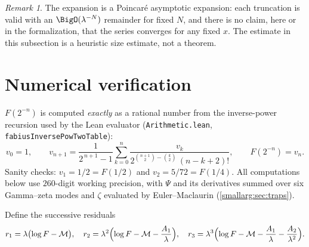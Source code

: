\documentclass[11pt,oneside]{article}
\theoremstyle{definition}
\theoremstyle{remark}
\newtheorem{remark}[remark]{Remark}
\begin{document}
\begin{remark}
The expansion is a Poincar\'e asymptotic expansion: each truncation is valid
with an $\BigO(\lambda^{-N})$ remainder for fixed $N$, and there is no claim,
here or in the formalization, that the series converges for any fixed $x$.
The estimate in this subsection is a heuristic size estimate, not a theorem.
\end{remark}

\section{Numerical verification}\label{smallarg:sec:numerics}

$F(2^{-n})$ is computed \emph{exactly} as a rational number from the
inverse-power recursion used by the Lean evaluator
(\nolinkurl{Arithmetic.lean}, \lstinline[style=pseudo]{fabiusInversePowTwoTable}):
\[
  v_0=1,\qquad
  v_{n+1}=\frac{1}{2^{\,n+1}-1}
    \sum_{k=0}^{n}\frac{v_k}{2^{\binom{n+1}{2}-\binom{k}{2}}\,(n-k+2)!},
  \qquad F(2^{-n})=v_n.
\]
Sanity checks: $v_1=1/2=F(1/2)$ and $v_2=5/72=F(1/4)$.  All computations below
use $260$-digit working precision, with $\Psi$ and its derivatives summed over
six Gamma--zeta modes and $\zeta$ evaluated by Euler--Maclaurin
(\cref{smallarg:sec:traps}).

Define the successive residuals
\[
  r_1=\lambda\bigl(\log F-\mathcal M\bigr),\quad
  r_2=\lambda^2\Bigl(\log F-\mathcal M-\frac{A_1}{\lambda}\Bigr),\quad
  r_3=\lambda^3\Bigl(\log F-\mathcal M-\frac{A_1}{\lambda}-\frac{A_2}{\lambda^2}\Bigr).
\]

\begin{center}\small
{}
\end{center}
\end{document}
